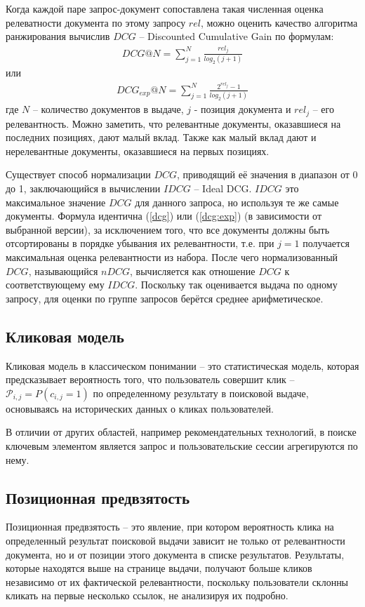 \documentclass[diploma]{nanolab2015}
\begin{document}
Когда каждой паре запрос-документ сопоставлена такая численная оценка релеватности документа по этому запросу $rel$, можно оценить качество алгоритма ранжирования вычислив $DCG$ -- Discounted Cumulative Gain по формулам:
\begin{align}
  DCG@N = \sum_{j=1}^{N} \frac{rel_j}{log_2(j+1)} \label{dcg}
\end{align}
или
\begin{align}
  DCG_{exp}@N = \sum_{j=1}^{N} \frac{2^{rel_j} - 1}{log_2(j+1)} \label{dcg:exp}
\end{align}
где $N$ -- количество документов в выдаче, $j$ - позиция документа и $rel_j$ -- его релевантность. Можно заметить, что релевантные документы, оказавшиеся на последних позициях, дают малый вклад. Также как малый вклад дают и нерелевантные документы, оказавшиеся на первых позициях.

Существует способ нормализации $DCG$, приводящий её значения в диапазон от 0 до 1, заключающийся в вычислении $IDCG$ -- Ideal DCG. $IDCG$ это максимальное значение $DCG$ для данного запроса, но используя те же самые документы. Формула идентична (\ref{dcg}) или (\ref{dcg:exp}) (в зависимости от выбранной версии), за исключением того, что все документы должны быть отсортированы в порядке убывания их релевантности, т.е. при $j=1$ получается максимальная оценка релевантности из набора.
После чего нормализованный $DCG$, называющийся $nDCG$, вычисляется как отношение $DCG$ к соответствующему ему $IDCG$. Поскольку так оценивается выдача по одному запросу, для оценки по группе запросов берётся среднее арифметическое.

\subsection{Кликовая модель}
Кликовая модель в классическом понимании -- это статистическая модель, которая предсказывает вероятность того, что пользователь совершит клик -- $\mathcal{P}_{i,j} = P(c_{i,j} = 1)$ по определенному результату в поисковой выдаче, основываясь на исторических данных о кликах пользователей.

В отличии от других областей, например рекомендательных технологий, в поиске ключевым элементом является запрос и пользовательские сессии агрегируются по нему.

\subsection{Позиционная предвзятость}
Позиционная предвзятость -- это явление, при котором вероятность клика на определенный результат поисковой выдачи зависит не только от релевантности документа, но и от позиции этого документа в списке результатов. Результаты, которые находятся выше на странице выдачи, получают больше кликов независимо от их фактической релевантности, поскольку пользователи склонны кликать на первые несколько ссылок, не анализируя их подробно.
\end{document}
